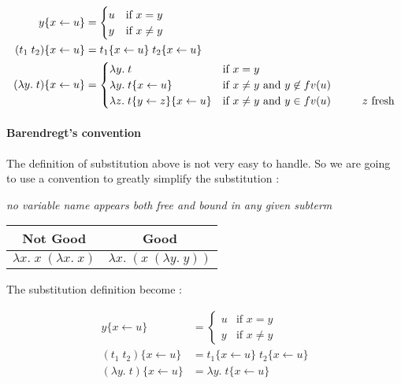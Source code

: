   \begin{align*}
    y\{x \leftarrow u\} &= \begin{cases}
      u & \text{if } x = y \\
      y & \text{if } x \not = y
    \end{cases} \\
    (t_1\; t_2)\{x \leftarrow u\} &= t_1\{x \leftarrow u\}\; t_2\{x \leftarrow
    u\} \\
    (\lambda y.\;t)\{x \leftarrow u\} &= \begin{cases}
      \lambda y.\;t &\text{if } x = y \\
      \lambda y.\;t\{x\leftarrow u\} &\text{if } x \not = y \text{ and } y \not
      \in fv(u)\\
      \lambda z.\;t\{y\leftarrow z\}\{x\leftarrow u\} &\text{if } x \not = y \text{ and } y \in
      fv(u) \text{\hspace{1cm}$z$ fresh}\\
    \end{cases}
  \end{align*}

  \paragraph{Barendregt's convention} The definition of substitution above is
  not very easy to handle. So we are going to use a convention to greatly
  simplify the substitution :

  \begin{center}
    \textit{no variable name appears both free and bound in any given subterm}
  \end{center}

  \begin{center}
    \begin{tabular}{c|c}
      Not Good & Good \\
      \hline
      $\lambda x.\;x\;(\lambda x.\;x)$ & $\lambda x.\;(x\;(\lambda y.\;y))$
    \end{tabular}
  \end{center}

  The substitution definition become :

  \begin{align*}
    y\{x \leftarrow u\} &= \begin{cases}
      u & \text{if } x = y \\
      y & \text{if } x \not = y
    \end{cases} \\
    (t_1\; t_2)\{x \leftarrow u\} &= t_1\{x \leftarrow u\}\; t_2\{x \leftarrow
    u\} \\
    (\lambda y.\;t)\{x \leftarrow u\} &= \lambda y.\; t\{x \leftarrow u\}
  \end{align*}

